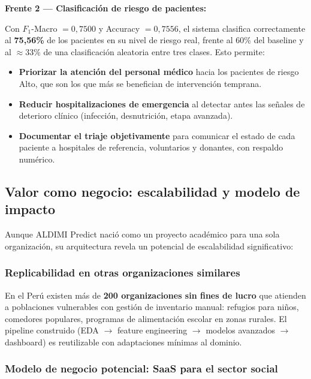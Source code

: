 \documentclass[12pt, a4paper]{article}
\begin{document}
\begin{warnbox}
\textbf{Frente 2 --- Clasificaci\'on de riesgo de pacientes:}

Con $F_1$-Macro $= 0{,}7500$ y Accuracy $= 0{,}7556$, el sistema clasifica correctamente al \textbf{75{,}56\%} de los pacientes en su nivel de riesgo real, frente al 60\% del baseline y al $\approx 33\%$ de una clasificaci\'on aleatoria entre tres clases. Esto permite:
\begin{itemize}[leftmargin=1.5em, itemsep=3pt]
  \item \textbf{Priorizar la atenci\'on del personal m\'edico} hacia los pacientes de riesgo Alto, que son los que m\'as se benefician de intervenci\'on temprana.
  \item \textbf{Reducir hospitalizaciones de emergencia} al detectar antes las se\~nales de deterioro cl\'inico (infecci\'on, desnutrici\'on, etapa avanzada).
  \item \textbf{Documentar el triaje objetivamente} para comunicar el estado de cada paciente a hospitales de referencia, voluntarios y donantes, con respaldo num\'erico.
\end{itemize}
\end{warnbox}

\subsection{Valor como negocio: escalabilidad y modelo de impacto}

Aunque ALDIMI Predict naci\'o como un proyecto acad\'emico para una sola organizaci\'on, su arquitectura revela un potencial de escalabilidad significativo:

\subsubsection{Replica\-bilidad en otras organizaciones similares}

En el Per\'u existen m\'as de \textbf{200 organizaciones sin fines de lucro} que atienden a poblaciones vulnerables con gesti\'on de inventario manual: refugios para ni\~nos, comedores populares, programas de alimentaci\'on escolar en zonas rurales. El pipeline construido (EDA $\rightarrow$ feature engineering $\rightarrow$ modelos avanzados $\rightarrow$ dashboard) es reutilizable con adaptaciones m\'inimas al dominio.

\subsubsection{Modelo de negocio potencial: SaaS para el sector social}
\end{document}
